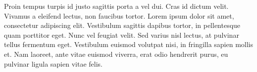 \label{an:exemplo-de-anexo}

Proin tempus turpis id justo sagittis porta a vel dui. Cras id dictum velit. Vivamus a eleifend lectus, non faucibus tortor. Lorem ipsum dolor sit amet, consectetur adipiscing elit. Vestibulum sagittis dapibus tortor, in pellentesque quam porttitor eget. Nunc vel feugiat velit. Sed varius nisl lectus, at pulvinar tellus fermentum eget. Vestibulum euismod volutpat nisi, in fringilla sapien mollis et. Nam laoreet, ante vitae euismod viverra, erat odio hendrerit purus, eu pulvinar ligula sapien vitae felis.
